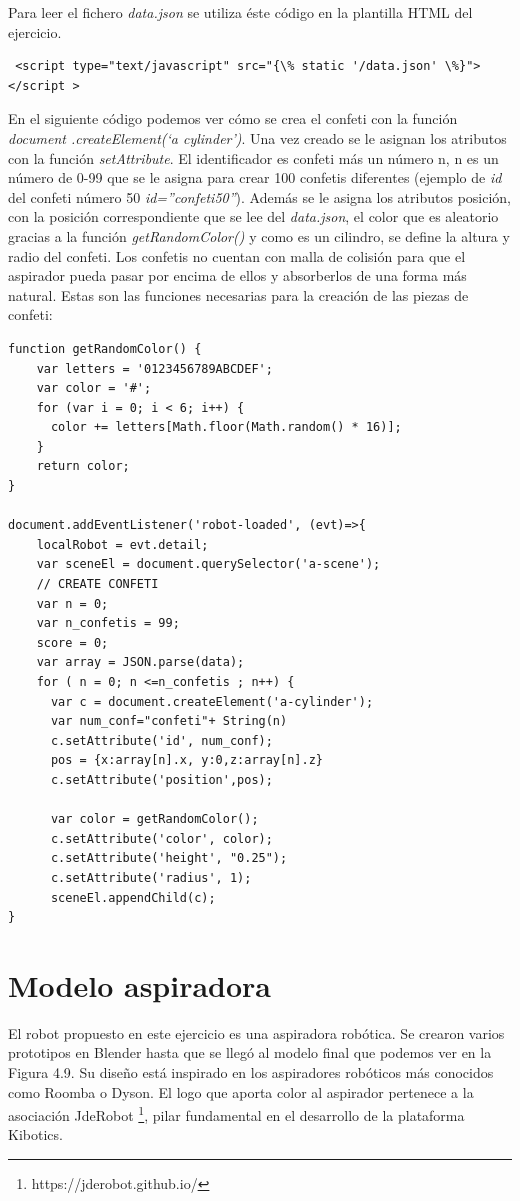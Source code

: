 Para leer el fichero \textit{data.json} se utiliza éste código en la plantilla HTML del ejercicio.
\begin{lstlisting}
 <script type="text/javascript" src="{\% static '/data.json' \%}"></script > 
 \end{lstlisting}


En el siguiente código podemos ver cómo se crea el confeti con la función \textit{document .createElement(`a\- cylinder')}. Una vez creado se le asignan los atributos con la función  \textit{setAttribute}.  El identificador es confeti más un número  n, n es un número de 0-99 que se le asigna para crear 100 confetis diferentes (ejemplo de \textit{id} del confeti número 50   \textit{id=''confeti50''}). Además se le asigna los atributos posición, con la posición correspondiente que se lee del \textit{data.json}, el color que es aleatorio gracias a la función \textit{getRandomColor()} y  como es un cilindro, se define la altura y radio del confeti.
Los confetis no cuentan con malla de colisión para que el aspirador pueda pasar por encima de ellos y absorberlos de una forma más natural.
Estas son las funciones necesarias para la creación de las piezas de confeti: 
\begin{lstlisting}
function getRandomColor() {
    var letters = '0123456789ABCDEF';
    var color = '#';
    for (var i = 0; i < 6; i++) {
      color += letters[Math.floor(Math.random() * 16)];
    }
    return color;
}

document.addEventListener('robot-loaded', (evt)=>{
    localRobot = evt.detail;
    var sceneEl = document.querySelector('a-scene');
    // CREATE CONFETI
    var n = 0;
    var n_confetis = 99;
    score = 0;
    var array = JSON.parse(data);
    for ( n = 0; n <=n_confetis ; n++) {
      var c = document.createElement('a-cylinder');
      var num_conf="confeti"+ String(n)
      c.setAttribute('id', num_conf);
      pos = {x:array[n].x, y:0,z:array[n].z}
      c.setAttribute('position',pos);
    
      var color = getRandomColor();
      c.setAttribute('color', color);
      c.setAttribute('height', "0.25");
      c.setAttribute('radius', 1);
      sceneEl.appendChild(c);
}
\end{lstlisting}

\section{Modelo aspiradora}

El robot propuesto en este ejercicio es una aspiradora robótica. Se crearon varios prototipos en Blender hasta que se llegó al modelo final que podemos ver en la Figura 4.9. Su diseño está inspirado en los aspiradores robóticos más conocidos como Roomba o Dyson. El logo que aporta color al aspirador pertenece a la asociación JdeRobot \footnote{https://jderobot.github.io/}, pilar fundamental en el desarrollo de la plataforma Kibotics.
 
